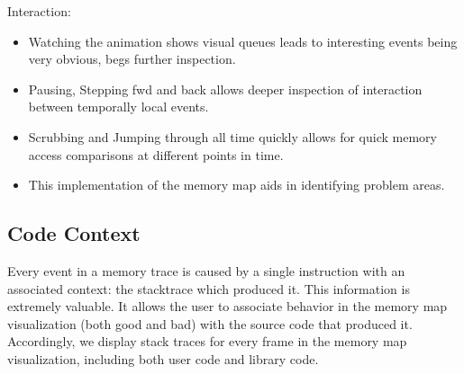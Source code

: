 \documentclass[annual]{acmsiggraph}
\begin{document}
Interaction:
   \begin{itemize}   
      \item Watching the animation shows visual queues leads to interesting events being very obvious, begs further inspection.
      \item Pausing, Stepping fwd and back allows deeper inspection of interaction between temporally local events.
      \item Scrubbing and Jumping through all time quickly allows for quick memory access comparisons at different points in time.
      \item This implementation of the memory map aids in identifying problem areas.
    \end{itemize}
  
  \subsection{Code Context}

    Every event in a memory trace is caused by a single instruction with an associated context: the stacktrace which produced it.
    This information is extremely valuable.
    It allows the user to associate behavior in the memory map visualization (both good and bad) 
      with the source code that produced it.
    Accordingly, we display stack traces for every frame in the memory map visualization, 
      including both user code and library code.
  
\end{document}
